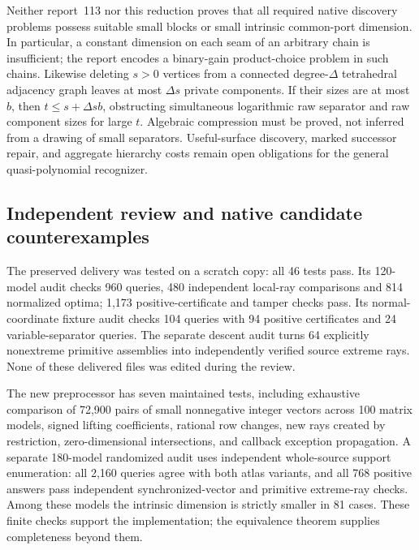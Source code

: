 Neither report~113 nor this reduction proves that all required native
discovery problems possess suitable small blocks or small intrinsic
common-port dimension.  In particular, a constant dimension on each
seam of an arbitrary chain is insufficient; the report encodes a
binary-gain product-choice problem in such chains.  Likewise deleting
$s>0$ vertices from a connected degree-$\Delta$ tetrahedral adjacency
graph leaves at most $\Delta s$ private components.  If their sizes are
at most $b$, then $t\leq s+\Delta sb$, obstructing simultaneous
logarithmic raw separator and raw component sizes for large $t$.
Algebraic compression must be proved, not inferred from a drawing of
small separators.  Useful-surface discovery, marked successor repair,
and aggregate hierarchy costs remain open obligations for the general
quasi-polynomial recognizer.

\subsection{Independent review and native candidate counterexamples}

The preserved delivery was tested on a scratch copy: all 46 tests pass.
Its 120-model audit checks 960 queries, 480 independent local-ray
comparisons and 814 normalized optima; 1,173 positive-certificate and
tamper checks pass.  Its normal-coordinate fixture audit checks 104
queries with 94 positive certificates and 24 variable-separator queries.
The separate descent audit turns 64 explicitly nonextreme primitive
assemblies into independently verified source extreme rays.  None of
these delivered files was edited during the review.

The new preprocessor has seven maintained tests, including exhaustive
comparison of 72,900 pairs of small nonnegative integer vectors across
100 matrix models, signed lifting coefficients, rational row changes,
new rays created by restriction, zero-dimensional intersections, and
callback exception propagation.  A separate 180-model randomized audit
uses independent whole-source support enumeration: all 2,160 queries
agree with both atlas variants, and all 768 positive answers pass
independent synchronized-vector and primitive extreme-ray checks.
Among these models the intrinsic dimension is strictly smaller in
81 cases.  These finite checks support the implementation; the
equivalence theorem supplies completeness beyond them.

